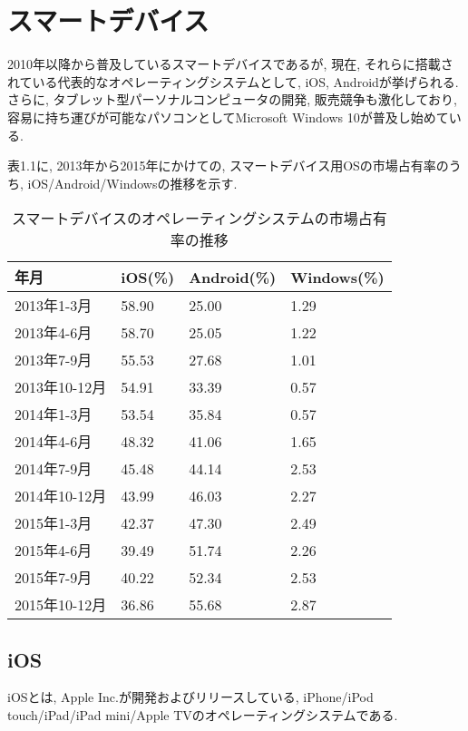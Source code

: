 \section{スマートデバイス}
2010年以降から普及しているスマートデバイスであるが, 現在, それらに搭載されている代表的なオペレーティングシステムとして, iOS, Androidが挙げられる.
さらに, タブレット型パーソナルコンピュータの開発, 販売競争も激化しており, 容易に持ち運びが可能なパソコンとしてMicrosoft Windows 10が普及し始めている.

表1.1に, 2013年から2015年にかけての, スマートデバイス用OSの市場占有率のうち, iOS/Android/Windowsの推移を示す.

\begin{table}[htb]
\begin{center}
\begin{tabular}{|l|p{3cm}|p{3cm}|p{3cm}|} \hline
年月 & iOS(\%) & Android(\%) & Windows(\%) \\ \hline \hline
2013年1-3月 & 58.90 & 25.00 & 1.29 \\ \hline
2013年4-6月 & 58.70 & 25.05 & 1.22 \\ \hline
2013年7-9月 & 55.53 & 27.68 & 1.01 \\ \hline
2013年10-12月 & 54.91 & 33.39 & 0.57 \\ \hline
2014年1-3月 & 53.54 & 35.84 & 0.57 \\ \hline
2014年4-6月 & 48.32 & 41.06 & 1.65 \\ \hline
2014年7-9月 & 45.48 & 44.14 & 2.53 \\ \hline
2014年10-12月 & 43.99 & 46.03 & 2.27 \\ \hline
2015年1-3月 & 42.37 & 47.30 & 2.49 \\ \hline
2015年4-6月 & 39.49 & 51.74 & 2.26 \\ \hline
2015年7-9月 & 40.22 & 52.34 & 2.53 \\ \hline
2015年10-12月 & 36.86 & 55.68 & 2.87 \\ \hline
\end{tabular}
\caption{スマートデバイスのオペレーティングシステムの市場占有率の推移}
\end{center}
\end{table}

\subsection{iOS}
iOSとは, Apple Inc.が開発およびリリースしている, iPhone/iPod touch/iPad/iPad mini/Apple TVのオペレーティングシステムである.

